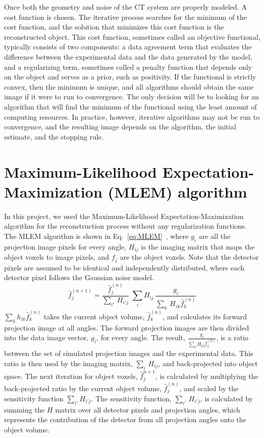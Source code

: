 Once both the geometry and noise of the CT system are properly modeled.  A cost function is chosen.  The iterative process searches for the minimum of the cost function, and the solution that minimizes this cost function is the reconstructed object.  This cost function, sometimes called an objective functional, typically consists of two components: a data agreement term that evaluates the difference between the experimental data and the data generated by the model, and a regularizing term, sometimes called a penalty function that depends only on the object and serves as a prior, such as positivity.  If the functional is strictly convex, then the minimum is unique, and all algorithms should obtain the same image if it were to run to convergence.  The only decision will be to looking for an algorithm that will find the minimum of the functional using the least amount of computing resources.  In practice, however, iterative algorithms may not be run to convergence, and the resulting image depends on the algorithm, the initial estimate, and the stopping rule.

\section{Maximum-Likelihood Expectation-Maximization (MLEM) algorithm }
In this project, we used the Maximum-Likelihood Expectation-Maximization algorithm for the reconstruction process without any regularization functions.  The MLEM algorithm is shown in Eq.~\ref{eq:MLEM}~\citep{EmissionTom2004}, where $g_i$ are all the projection image pixels for every angle, $H_{ij}$ is the imaging matrix that maps the object voxels to image pixels, and $f_{j}$ are the object voxels.  Note 
that the detector pixels are assumed to be identical and independently distributed, where each detector pixel follows the Gaussian noise model. 
%
\begin{equation}
\hat{f}^{(n+1)}_{j} = \frac{\hat{f}^{(n)}_j}{{\sum\limits_{i'}} \, H_{i'j}} \; 
						\sum\limits_{i} H_{ij} \, \frac{g_{i}}{\sum\limits_{k} \, H_{ik} \hat{f}_{k}^{(n)}}
\label{eq:MLEM}
\end{equation}
%
$\sum\limits_k h_{ik} \hat{f}_k^{(n)}$ takes the current object volume, $\hat{f}^{(n)}_k$, and calculates its forward projection image at all angles.  The forward projection images are then divided into the data image vector, $g_i$, for every angle.  The result, $\frac{g_i}{\sum\limits_k H_{ik} \hat{f}_k^{(n)}}$, is a ratio between the set of simulated projection images and the experimental data.  This ratio is then used by the imaging matrix, $\sum\limits_i \, H_{ij}$, and back-projected into object space.  The next iteration for object voxels, $\hat{f}_j^{n+1}$, is calculated by multiplying the back-projected ratio by the current object volume, $\hat{f}_j^{(n)}$, and scaled by the sensitivity function $\sum\limits_{i'} H_{i'j}$.  The sensitivity function, $\sum\limits_{i'} \, H_{i' j}$, is calculated by summing the $H$ matrix over all detector pixels and projection angles, which represents the contribution of the detector from all projection angles onto the object volume.

